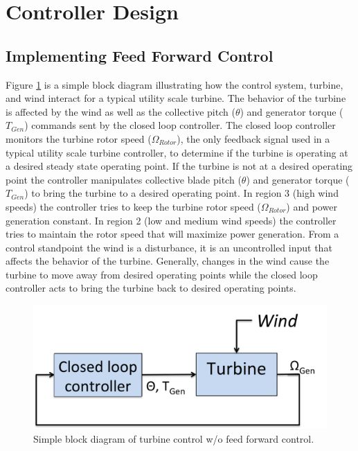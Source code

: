 \section{Controller Design} \label{section3-3}

\subsection{Implementing Feed Forward Control} \label{section3-3-1}

Figure \ref{fig3-7} is a simple block diagram illustrating how the control system, turbine, and wind interact for a typical utility scale turbine. The behavior of the turbine is affected by the wind as well as the collective pitch ($\theta$) and generator torque ($T_{Gen}$) commands sent by the closed loop controller. The closed loop controller monitors the turbine rotor speed ($\Omega_{Rotor}$), the only feedback signal used in a typical utility scale turbine controller, to determine if the turbine is operating at a desired steady state operating point. If the turbine is not at a desired operating point the controller manipulates collective blade pitch ($\theta$) and generator torque ($T_{Gen}$) to bring the turbine to a desired operating point. In region 3 (high wind speeds) the controller tries to keep the turbine rotor speed ($\Omega_{Rotor}$) and power generation constant. In region 2 (low and medium wind speeds) the controller tries to maintain the rotor speed that will maximize power generation. From a control standpoint the wind is a disturbance, it is an uncontrolled input that affects the behavior of the turbine. Generally, changes in the wind cause the turbine to move away from desired operating points while the closed loop controller acts to bring the turbine back to desired operating points.


 \begin{figure}[htbp]
	\centering
		\includegraphics[width=.6\linewidth]{Figures/ch3Figures/fig3-7.png}
		
	\caption{Simple block diagram of turbine control w/o feed forward control.}
	\label{fig3-7}
\end{figure}

